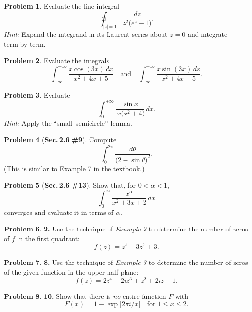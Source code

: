 \documentclass[10pt]{article}
\theoremstyle{definition} %
\newtheorem{problem}{Problem}
\theoremstyle{plain} %
\begin{document}
\begin{problem}
  Evaluate the line integral
  \[
      \oint_{\lvert z\rvert = 1} \frac{dz}{z^{2}\bigl(e^{z}-1\bigr)}.
  \]
  \textit{Hint:} Expand the integrand in its Laurent series about \(z=0\) and integrate term‑by‑term.
\end{problem}
\begin{problem}
  Evaluate the integrals
  \[
      \int_{-\infty}^{+\infty} \frac{x\cos(3x)\,dx}{x^{2}+4x+5}
      \quad\text{and}\quad
      \int_{-\infty}^{+\infty} \frac{x\sin(3x)\,dx}{x^{2}+4x+5}.
  \]
\end{problem}

\begin{problem}
  Evaluate
  \[
      \int_{0}^{+\infty} \frac{\sin x}{\,x\bigl(x^{2}+4\bigr)}\,dx.
  \]
  \textit{Hint:} Apply the “small–semicircle’’ lemma.
\end{problem}

\begin{problem}[\textbf{Sec.\,2.6 \#9}]
  Compute
  \[
      \int_{0}^{2\pi} \frac{d\theta}{\bigl(2-\sin\theta\bigr)^{2}}.
  \]
  (This is similar to Example 7 in the textbook.)
\end{problem}

\begin{problem}[\textbf{Sec.\,2.6 \#13}]
  Show that, for \(0<\alpha<1\),
  \[
      \int_{0}^{\infty} \frac{x^{\alpha}}{x^{2}+3x+2}\,dx
  \]
  converges and evaluate it in terms of \(\alpha\).
\end{problem}

  \begin{problem}
  \textbf{2.} Use the technique of \emph{Example 2} to determine the number of zeros of \(f\) in the first quadrant:
  \[
    f(z)=z^{4}-3z^{2}+3.
  \]
  \end{problem}
  

  
  \begin{problem}
  \textbf{8.} Use the technique of \emph{Example 3} to determine the number of zeros of the given function in the upper half‑plane:
  \[
    f(z)=2z^{4}-2i z^{3}+z^{2}+2i z-1.
  \]
  \end{problem}
  
  \begin{problem}
  \textbf{10.} Show that there is \emph{no} entire function \(F\) with
  \[
    F(x)=1-\exp\!\bigl[2\pi i / x\bigr]
    \quad\text{for } 1\le x\le 2.
  \]
  \end{problem}
  
\end{document}
